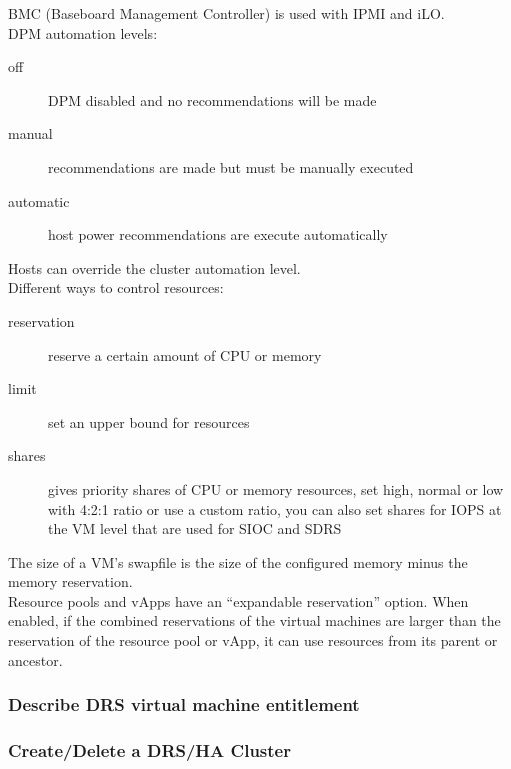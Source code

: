 BMC (Baseboard Management Controller) is used with IPMI and iLO.\\

DPM automation levels:

\begin{description}

\item[off]
DPM disabled and no recommendations will be made

\item[manual]
recommendations are made but must be manually executed

\item[automatic]
host power recommendations are execute automatically

\end{description}

Hosts can override the cluster automation level.\\

Different ways to control resources:

\begin{description}

\item[reservation]
reserve a certain amount of CPU or memory

\item[limit]
set an upper bound for resources

\item[shares]
gives priority shares of CPU or memory resources, set high, normal or low
with 4:2:1 ratio or use a custom ratio, you can also set shares for IOPS
at the VM level that are used for SIOC and SDRS

\end{description}

The size of a VM's swapfile is the size of the configured memory minus
the memory reservation.\\

Resource pools and vApps have an ``expandable reservation'' option. When
enabled, if the combined reservations of the virtual machines are larger
than the reservation of the resource pool or vApp, it can use resources from
its parent or ancestor.

\subsubsection{Describe DRS virtual machine entitlement}

\subsubsection{Create/Delete a DRS/HA Cluster}

